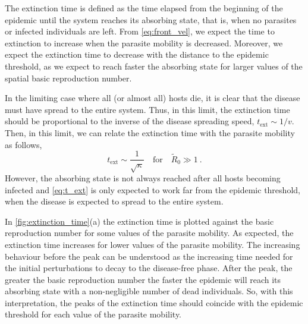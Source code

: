 The extinction time is defined as the time elapsed from the beginning of
the epidemic until the system reaches its absorbing state, that is, when no
parasites or infected individuals are left. From \cref{eq:front_vel}, we expect
the time to extinction to increase when the parasite mobility is decreased.
Moreover, we expect the extinction time to decrease with the distance to the
epidemic threshold, as we expect to reach faster the absorbing state for larger
values of the spatial basic reproduction number.

In the limiting case where all (or almost all) hosts die, it is clear that
the disease must have spread to the entire system. Thus, in this limit, the
extinction time should be proportional to the inverse of the disease spreading
speed, $t_{\textrm{ext}}\sim 1/v$. Then, in this limit, we can relate the
extinction time with the parasite mobility as follows,
\begin{equation}\label{eq:t_ext}
    t_{\textrm{ext}}\sim\frac{1}{\sqrt{\kappa}} \quad \textrm{for} \quad
    \tilde{R}_0\gg1 \ .
\end{equation}
However, the absorbing state is not always reached after all hosts becoming
infected and \cref{eq:t_ext} is only expected to work far from the epidemic
threshold, when the disease is expected to spread to the entire system.

In \cref{fig:extinction_time}(a) the extinction time is plotted against the
basic reproduction number for some values of the parasite mobility. As
expected, the extinction time increases for lower values of the parasite
mobility. The increasing behaviour before the peak can be understood as the
increasing time needed for the initial perturbations to decay to the
disease-free phase. After the peak, the greater the basic reproduction number
the faster the epidemic will reach its absorbing state with a non-negligible
number of dead individuals. So, with this interpretation, the peaks of the
extinction time should coincide with the epidemic threshold for each value of
the parasite mobility.

